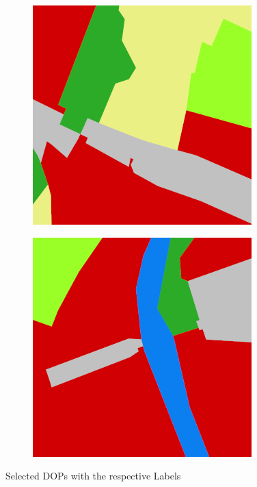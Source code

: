 \begin{figure}
\begin{subfigure}{\DopLabelImageWidth}
    \end{subfigure}
    \hfill
    \begin{subfigure}{\DopLabelImageWidth}
        \includegraphics[width=\textwidth]{images/2281_label}
    \end{subfigure}
    \hfill
    \begin{subfigure}{\DopLabelImageWidth}
        \includegraphics[width=\textwidth]{images/3589_label}
    \end{subfigure}
    \hfill

    \caption{Selected DOPs with the respective Labels}
    \label{fig:dop_with_labels}
\end{figure}

